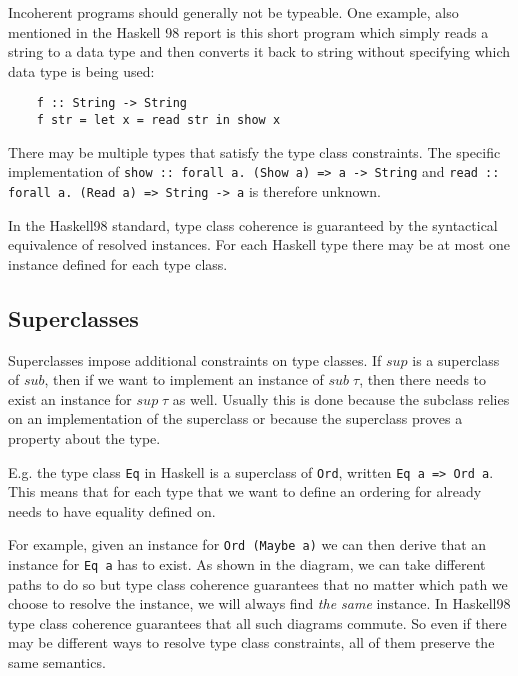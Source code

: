 Incoherent programs should generally not be typeable.
One example, also mentioned in the Haskell 98 report \cite{Haskell98} is this short program which simply reads a string to a data type and then converts it back to string without specifying which data type is being used:

\begin{verbatim}
    f :: String -> String
    f str = let x = read str in show x
\end{verbatim}

There may be multiple types that satisfy the type class constraints.
The specific implementation of \texttt{show :: forall a. (Show a) => a -> String} and \texttt{read :: forall a. (Read a) => String -> a} is therefore unknown.

In the Haskell98 standard, type class coherence is guaranteed by the syntactical equivalence of resolved instances.
For each Haskell type there may be at most one instance defined for each type class.


\subsection{Superclasses}

Superclasses impose additional constraints on type classes.
If $sup$ is a superclass of $sub$, then if we want to implement an instance of $sub \;\tau$, then there needs to exist an instance for $sup \;\tau$ as well.
Usually this is done because the subclass relies on an implementation of the superclass or because the superclass proves a property about the type.

E.g. the type class \texttt{Eq} in Haskell is a superclass of \texttt{Ord}, written \texttt{Eq a => Ord a}.
This means that for each type that we want to define an ordering for already needs to have equality defined on.

For example, given an instance for \texttt{Ord (Maybe a)} we can then derive that an instance for \texttt{Eq a} has to exist.
As shown in the diagram, we can take different paths to do so but type class coherence guarantees that no matter which path we choose to resolve the instance, we will always find \emph{the same} instance.
In Haskell98 type class coherence guarantees that all such diagrams commute.
So even if there may be different ways to resolve type class constraints, all of them preserve the same semantics.

